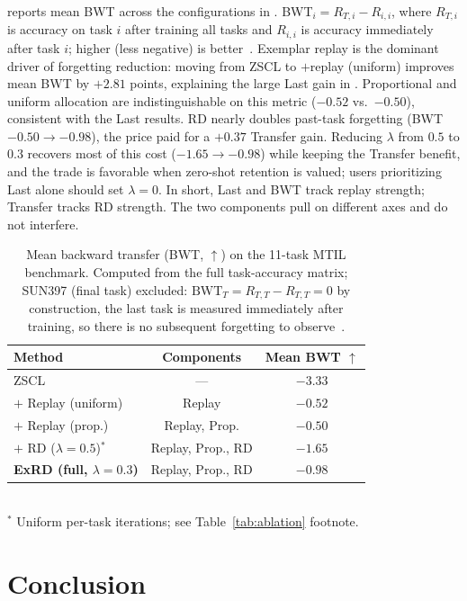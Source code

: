 \documentclass{article}
\newcommand{\project}{ExRD}
\begin{document}
   reports mean BWT across the configurations in
  . BWT$_i = R_{T,i} - R_{i,i}$, where $R_{T,i}$ is accuracy on task $i$ after training all tasks and $R_{i,i}$ is accuracy immediately after task $i$; higher (less negative) is better~\citep{lopezpaz2017gem}. Exemplar replay is the dominant driver of forgetting reduction: moving from ZSCL to $+$replay (uniform) improves mean BWT by $+2.81$ points, explaining the large Last gain in . Proportional and uniform allocation are indistinguishable on this metric ($-0.52$ vs.\ $-0.50$), consistent with the Last results. RD nearly doubles past-task forgetting (BWT $-0.50 \to -0.98$), the price paid for a $+0.37$ Transfer gain. Reducing $\lambda$ from $0.5$ to $0.3$ recovers most of this cost ($-1.65 \to -0.98$) while keeping the Transfer benefit, and the trade is favorable when zero-shot retention is valued; users prioritizing Last alone should set $\lambda{=}0$. In short, Last and BWT track replay strength; Transfer tracks RD strength. The two components pull on different axes and do not interfere.
 \begin{table}[h]
  \centering
  \caption{Mean backward transfer (BWT, $\uparrow$) on the 11-task MTIL benchmark. Computed from the full task-accuracy matrix; SUN397 (final task) excluded: $\text{BWT}_T = R_{T,T} - R_{T,T} = 0$ by construction, the last task is measured immediately after training, so there is no subsequent forgetting to observe~\citep{lopezpaz2017gem}.}
  \label{tab:bwt}
  \begin{tabular}{lcc}
  \toprule
  Method & Components & Mean BWT $\uparrow$ \\
  \midrule
  ZSCL~\citep{zheng2023zscl}            & ---                   & $-3.33$ \\
  {$+$ Replay (uniform)}                & Replay                & $-0.52$ \\
  {$+$ Replay (prop.)}                  & Replay, Prop.         & $-0.50$ \\
  {$+$ RD ($\lambda{=}0.5$)}$^\ast$     & Replay, Prop., RD     & $-1.65$ \\
  \textbf{\project{ } (full, $\lambda{=}0.3$)} & Replay, Prop., RD     & $-0.98$ \\
  \bottomrule
  \end{tabular}
  \\[2pt]
  {\small $^\ast$ Uniform per-task iterations; see Table~\ref{tab:ablation} footnote.}
  \end{table}
\section{Conclusion}
\end{document}
